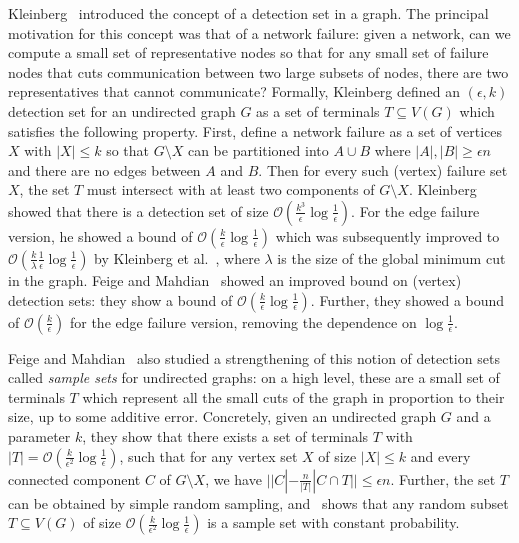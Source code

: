 \documentclass[11pt]{article}
\newcommand{\OO}{\mathcal{O}}
\begin{document}
Kleinberg~\cite{kleinberg2004detecting} introduced the concept of a detection set in a graph. The principal motivation for this concept was that of a network failure:  given a network, can we compute a small set of representative nodes so that for any  small set of failure nodes that cuts communication between two large subsets of nodes, there are two representatives that cannot communicate? Formally, Kleinberg defined an $(\epsilon, k)$ detection set for an undirected graph $G$ as a set of terminals $T \subseteq V(G)$ which satisfies the following property. First, define a network failure as a set of 
vertices $X$ with $|X| \leq k$ so that $G \setminus X$ can be partitioned into $A \cup B$ where $|A|, |B| \geq \epsilon n$ and there are no edges between $A$ and $B$. Then for every such (vertex) failure set $X$, the set $T$ must intersect with at least two components of $G \setminus X$. Kleinberg~\cite{kleinberg2004detecting} showed that there is a detection set of size $\OO(\frac{k^3}{\epsilon} \log \frac{1}{\epsilon})$. For the edge failure version, he showed a bound of $\OO(\frac{k}{\epsilon} \log \frac{1}{\epsilon})$ which was subsequently improved to $\OO(\frac{k}{\lambda}\frac{1}{\epsilon} \log \frac{1}{\epsilon})$ by Kleinberg et al.~\cite{kleinberg2008network}, where $\lambda$ is the size of the global minimum cut in the graph. Feige and Mahdian~\cite{fm06} showed an improved bound on (vertex) detection sets: they show a bound of $\OO(\frac{k}{\epsilon} \log \frac{1}{\epsilon})$. Further, they showed a bound of $\OO(\frac{k}{\epsilon})$ for the edge failure version, removing the dependence on $\log \frac{1}{\epsilon}$. 


Feige and Mahdian~\cite{fm06} also studied a strengthening of this notion of detection sets called \emph{sample sets} for undirected graphs: on a high level, these are a small set of terminals $T$ which represent all the small cuts of the graph in proportion to their size, up to some additive error. Concretely, given an undirected graph $G$ and a parameter $k$, they show that there exists a set of terminals $T$ with $|T| = \OO(\frac{k}{\epsilon^2} \log \frac{1}{\epsilon})$, such that for any vertex set $X$ of size $|X| \leq k$ and every connected component $C$ of $G \setminus X$, we have $||C| - \frac{n}{|T|} |C \cap T|| \leq \epsilon n$. Further, the set $T$ can be obtained by simple random sampling, and~\cite{fm06} shows that any random subset $T \subseteq V(G)$ of size $\OO(\frac{k}{\epsilon^2} \log \frac{1}{\epsilon})$ is a sample set with constant probability. 
\end{document}
